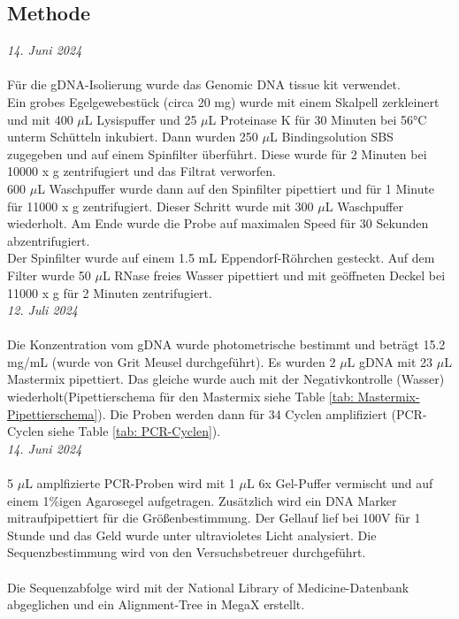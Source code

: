 \documentclass[oneside,10pt,a4paper]{report}
\begin{document}
			
			\subsection{Methode}
				\textit{14. Juni 2024}\\
				\\
				Für die gDNA-Isolierung wurde das Genomic DNA tissue kit verwendet.\\
				Ein grobes Egelgewebestück (circa 20 mg) wurde mit einem Skalpell zerkleinert und mit 400 $\mu$L Lysispuffer und 25 $\mu$L Proteinase K für 30 Minuten bei 56°C unterm Schütteln inkubiert. Dann wurden 250 $\mu$L Bindingsolution SBS zugegeben und auf einem Spinfilter überführt. Diese wurde für 2 Minuten bei 10000 x g zentrifugiert und das Filtrat verworfen.\\
				600 $\mu$L Waschpuffer wurde dann auf den Spinfilter pipettiert und für 1 Minute für 11000 x g zentrifugiert. Dieser Schritt wurde mit 300 $\mu$L Waschpuffer wiederholt. Am Ende wurde die Probe auf maximalen Speed für 30 Sekunden abzentrifugiert.\\
				Der Spinfilter wurde auf einem 1.5 mL Eppendorf-Röhrchen gesteckt. Auf dem Filter wurde 50 $\mu$L RNase freies Wasser pipettiert und mit geöffneten Deckel bei 11000 x g für 2 Minuten zentrifugiert.
				\\
				\textit{12. Juli 2024}\\
				\\
				Die Konzentration vom gDNA wurde photometrische bestimmt und beträgt 15.2 mg/mL (wurde von Grit Meusel durchgeführt).
				Es wurden 2 $\mu$L gDNA mit 23 $\mu$L Mastermix pipettiert. Das gleiche wurde auch mit der Negativkontrolle (Wasser) wiederholt(Pipettierschema für den Mastermix siehe Table \ref{tab: Mastermix-Pipettierschema}).
				Die Proben werden dann für 34 Cyclen amplifiziert (PCR-Cyclen siehe Table \ref{tab: PCR-Cyclen}).
				\\
				\textit{14. Juni 2024}\\
				\\
				5 $\mu$L amplfizierte PCR-Proben wird mit 1 $\mu$L 6x Gel-Puffer vermischt und auf einem 1$\%$igen Agarosegel aufgetragen. Zusätzlich wird ein DNA Marker mitraufpipettiert für die Größenbestimmung.
				Der Gellauf lief bei 100V für 1 Stunde und das Geld wurde unter ultravioletes Licht analysiert. Die Sequenzbestimmung wird von den Versuchsbetreuer durchgeführt.\\
				\\
				Die Sequenzabfolge wird mit der National Library of Medicine-Datenbank abgeglichen und ein Alignment-Tree in MegaX erstellt.
				
\end{document}

